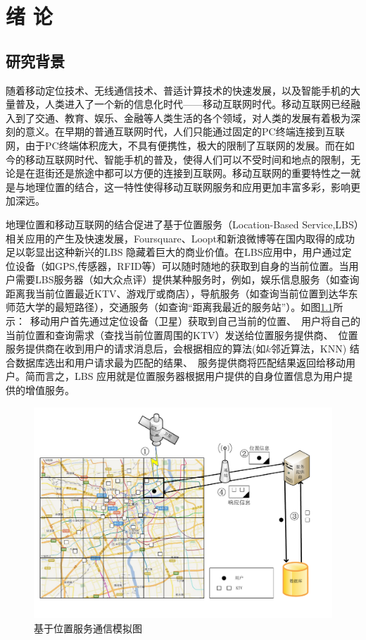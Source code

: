 \chapter{绪\hskip 0.4cm 论}
\label{chap1}

\section{研究背景}

随着移动定位技术、无线通信技术、普适计算技术的快速发展，以及智能手机的大量普及，人类进入了一个新的信息化时代——移动互联网时代。移动互联网已经融入到了交通、教育、娱乐、金融等人类生活的各个领域，对人类的发展有着极为深刻的意义。在早期的普通互联网时代，人们只能通过固定的PC终端连接到互联网，由于PC终端体积庞大，不具有便携性，极大的限制了互联网的发展。而在如今的移动互联网时代、智能手机的普及，使得人们可以不受时间和地点的限制，无论是在逛街还是旅途中都可以方便的连接到互联网。移动互联网的重要特性之一就是与地理位置的结合，这一特性使得移动互联网服务和应用更加丰富多彩，影响更加深远。

地理位置和移动互联网的结合促进了基于位置服务（Location-Based Service,LBS）相关应用的产生及快速发展，Foursquare、Loopt和新浪微博等在国内取得的成功足以彰显出这种新兴的LBS 隐藏着巨大的商业价值。在LBS应用中，用户通过定位设备（如GPS,传感器，RFID等）可以随时随地的获取到自身的当前位置。当用户需要LBS服务器（如大众点评）提供某种服务时，例如，娱乐信息服务（如查询距离我当前位置最近KTV、游戏厅或商店），导航服务（如查询当前位置到达华东师范大学的最短路径），交通服务（如查询“距离我最近的服务站”）。如图\ref{fig:communcationMode_pdf}所示：~移动用户首先通过定位设备（卫星）获取到自己当前的位置、~用户将自己的当前位置和查询需求（查找当前位置周围的KTV）发送给位置服务提供商、~位置服务提供商在收到用户的请求消息后，会根据相应的算法(如{$k$}邻近算法，KNN) 结合数据库选出和用户请求最为匹配的结果、~服务提供商将匹配结果返回给移动用户。简而言之，LBS 应用就是位置服务器根据用户提供的自身位置信息为用户提供的增值服务\cite{Mobile}。


\begin{figure}[H]
\centering
\includegraphics[width=15 cm]{fig/communcationMode.pdf}
\caption{基于位置服务通信模拟图} %
\label{fig:communcationMode_pdf}
\end{figure}

